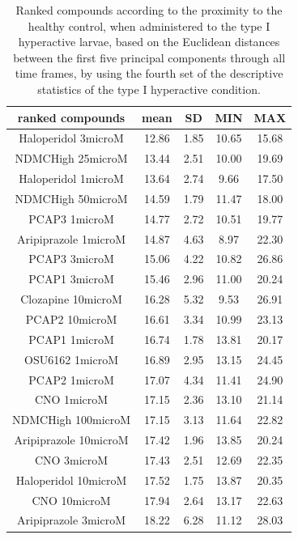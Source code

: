 \documentclass[a4paper,12pt]{article}
\begin{document}
\begin{table}[h!]\tiny
\centering
\caption{Ranked compounds according to the proximity to the healthy control, when administered to the type I hyperactive larvae, based on the Euclidean distances between the first five principal components through all time frames, by using the fourth set of the descriptive statistics of the type I hyperactive condition.}
\begin{tabular}{|c|c|c|c|c|}
\hline
ranked compounds             & mean & SD   & MIN  & MAX   \\ \hline
Haloperidol 3microM   & 12.86 & 1.85 & 10.65 & 15.68 \\ \hline
NDMCHigh 25microM     & 13.44 & 2.51 & 10.00    & 19.69 \\ \hline
Haloperidol 1microM   & 13.64 & 2.74 & 9.66  & 17.50  \\ \hline
NDMCHigh 50microM     & 14.59 & 1.79 & 11.47 & 18.00    \\ \hline
PCAP3 1microM       & 14.77 & 2.72 & 10.51 & 19.77 \\ \hline
Aripiprazole 1microM  & 14.87 & 4.63 & 8.97  & 22.30  \\ \hline
PCAP3 3microM       & 15.06 & 4.22 & 10.82 & 26.86 \\ \hline
PCAP1 3microM         & 15.46 & 2.96 & 11.00    & 20.24 \\ \hline
Clozapine 10microM    & 16.28 & 5.32 & 9.53  & 26.91 \\ \hline
PCAP2 10microM        & 16.61 & 3.34 & 10.99 & 23.13 \\ \hline
PCAP1 1microM         & 16.74 & 1.78 & 13.81 & 20.17 \\ \hline
OSU6162 1microM       & 16.89 & 2.95 & 13.15 & 24.45 \\ \hline
PCAP2 1microM         & 17.07 & 4.34 & 11.41 & 24.90  \\ \hline
CNO 1microM           & 17.15 & 2.36 & 13.10  & 21.14 \\ \hline
NDMCHigh 100microM    & 17.15 & 3.13 & 11.64 & 22.82 \\ \hline
Aripiprazole 10microM & 17.42 & 1.96 & 13.85 & 20.24 \\ \hline
CNO 3microM           & 17.43 & 2.51 & 12.69 & 22.35 \\ \hline
Haloperidol 10microM  & 17.52 & 1.75 & 13.87 & 20.35 \\ \hline
CNO 10microM          & 17.94 & 2.64 & 13.17 & 22.63 \\ \hline
Aripiprazole 3microM  & 18.22 & 6.28 & 11.12 & 28.03 \\ \hline

\end{tabular}
\end{table}
\end{document}
